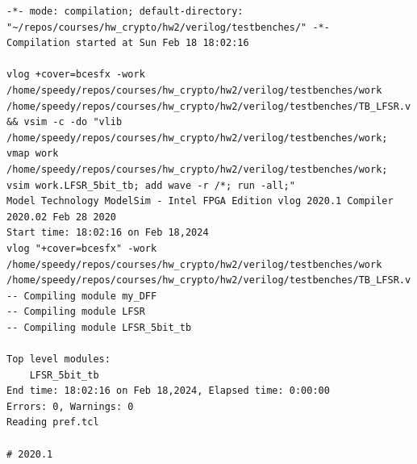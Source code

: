 \documentclass[a4paper,11pt]{exam}
\begin{document}
\begin{lstlisting}
-*- mode: compilation; default-directory: "~/repos/courses/hw_crypto/hw2/verilog/testbenches/" -*-
Compilation started at Sun Feb 18 18:02:16

vlog +cover=bcesfx -work /home/speedy/repos/courses/hw_crypto/hw2/verilog/testbenches/work /home/speedy/repos/courses/hw_crypto/hw2/verilog/testbenches/TB_LFSR.v && vsim -c -do "vlib /home/speedy/repos/courses/hw_crypto/hw2/verilog/testbenches/work; vmap work /home/speedy/repos/courses/hw_crypto/hw2/verilog/testbenches/work; vsim work.LFSR_5bit_tb; add wave -r /*; run -all;" 
Model Technology ModelSim - Intel FPGA Edition vlog 2020.1 Compiler 2020.02 Feb 28 2020
Start time: 18:02:16 on Feb 18,2024
vlog "+cover=bcesfx" -work /home/speedy/repos/courses/hw_crypto/hw2/verilog/testbenches/work /home/speedy/repos/courses/hw_crypto/hw2/verilog/testbenches/TB_LFSR.v 
-- Compiling module my_DFF
-- Compiling module LFSR
-- Compiling module LFSR_5bit_tb

Top level modules:
	LFSR_5bit_tb
End time: 18:02:16 on Feb 18,2024, Elapsed time: 0:00:00
Errors: 0, Warnings: 0
Reading pref.tcl

# 2020.1


\end{lstlisting}
\end{document}
